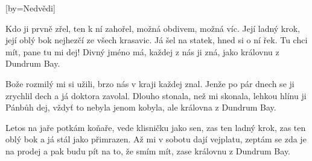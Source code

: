 [by={Nedvědi}]

\beginverse{}
Kdo ji prvně zřel, ten k ní zahořel,
možná obdivem, možná víc. 
Její ladný krok, její oblý bok
nejhezčí ze všech krasavic.
\lrep{} Já šel na statek, hned si o ní řek.
Tu chci mít, pane tu mi dej! 
Divný jméno má, každej z nás ji zná,
jako královnu z Dundrum Bay. \rrep{}
\endverse{}

\beginverse{}
\chordsoff{}
Bože rozmilý mi si užili,
brzo nás v kraji každej znal. 
Jenže po pár dnech se ji zrychlil dech
a já doktora zavolal.
\lrep{} Dlouho stonala, než mi skonala,
lehkou hlínu ji Pánbůh dej, 
vždyť to nebyla jenom kobyla,
ale královna z Dundrum Bay. \rrep{}
\chordson{}
\endverse{}

\beginverse{}
\chordsoff{}
Letos na jaře potkám koňaře,
vede klisničku jako sen, 
zas ten ladný krok, zas ten oblý bok
a já stál jako přimrazen.
\lrep{} Až mi v sobotu dají vejplatu,
zeptám se zda je na prodej 
a pak budu pít na to, že smím mít,
zase královnu z Dundrum Bay. \rrep{}
\chordson{}
\endverse{}

\endsong{}
